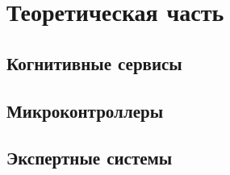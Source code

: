 \chapter{Теоретическая часть}
\section{Когнитивные сервисы}
\section{Микроконтроллеры}
\section{Экспертные системы}